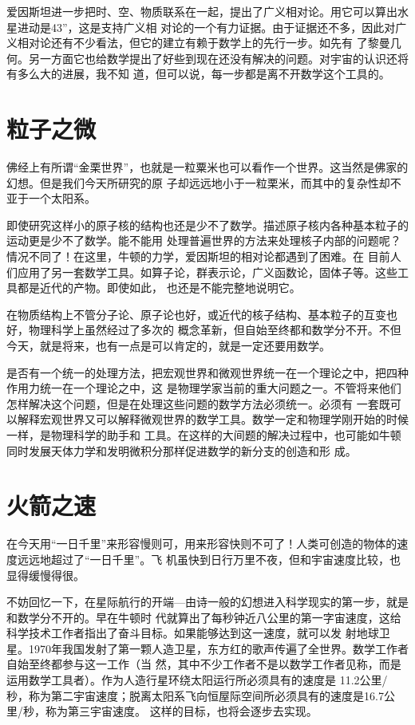 \documentclass[twoside,openright,headings=optiontohead]{ctexbook} %
\begin{document}
{爱因斯坦进一步把时、空、物质联系在一起，提出了广义相对论。用它可以算出水星进动是43''，这是支持广义相
对论的一个有力证据。由于证据还不多，因此对广义相对论还有不少看法，但它的建立有赖于数学上的先行一步。如先有
了黎曼几何。另一方面它也给数学提出了好些到现在还没有解决的问题。对宇宙的认识还将有多么大的进展，我不知
道，但可以说，每一步都是离不开数学这个工具的。

\hypertarget{ux7c92ux5b50ux4e4bux5fae}{%
\section*{粒子之微}\label{ux7c92ux5b50ux4e4bux5fae}}

佛经上有所谓``金栗世界''，也就是一粒粟米也可以看作一个世界。这当然是佛家的幻想。但是我们今天所研究的原
子却远远地小于一粒栗米，而其中的复杂性却不亚于一个太阳系。

即使研究这样小的原子核的结构也还是少不了数学。描述原子核内各种基本粒子的运动更是少不了数学。能不能用
处理普遍世界的方法来处理核子内部的问题呢？情况不同了！在这里，牛顿的力学，爱因斯坦的相对论都遇到了困难。在
目前人们应用了另一套数学工具。如算子论，群表示论，广义函数论，固体子等。这些工具都是近代的产物。即使如此，
也还是不能完整地说明它。

在物质结构上不管分子论、原子论也好，或近代的核子结构、基本粒子的互变也好，物理科学上虽然经过了多次的
概念革新，但自始至终都和数学分不开。不但今天，就是将来，也有一点是可以肯定的，就是一定还要用数学。

是否有一个统一的处理方法，把宏观世界和微观世界统一在一个理论之中，把四种作用力统一在一个理论之中，这
是物理学家当前的重大问题之一。不管将来他们怎样解决这个问题，但是在处理这些问题的数学方法必须统一。必须有
一套既可以解释宏观世界又可以解释微观世界的数学工具。数学一定和物理学刚开始的时候一样，是物理科学的助手和
工具。在这样的大间题的解决过程中，也可能如牛顿同时发展天体力学和发明微积分那样促进数学的新分支的创造和形
成。

\hypertarget{ux706bux7badux4e4bux901f}{%
\section*{火箭之速}\label{ux706bux7badux4e4bux901f}}

在今天用``一日千里''来形容慢则可，用来形容快则不可了！人类可创造的物体的速度远远地超过了``一日千里''。飞
机虽快到日行万里不夜，但和宇宙速度比较，也显得缓慢得很。

不妨回忆一下，在星际航行的开端---由诗一般的幻想进入科学现实的第一步，就是和数学分不开的。早在牛顿时
代就算出了每秒钟近八公里的第一字宙速度，这给科学技术工作者指出了奋斗目标。如果能够达到这一速度，就可以发
射地球卫星。1970年我国发射了第一颗人造卫星，东方红的歌声传遍了全世界。数学工作者自始至终都参与这一工作（当
然，其中不少工作者不是以数学工作者见称，而是运用数学工具者）。作为人造行星环绕太阳运行所必须具有的速度是
11.2公里/秒，称为第二宇宙速度；脱离太阳系飞向恒屋际空间所必须具有的速度是16.7公里/秒，称为第三宇宙速度。
这样的目标，也将会逐步去实现。

}
\end{document}
